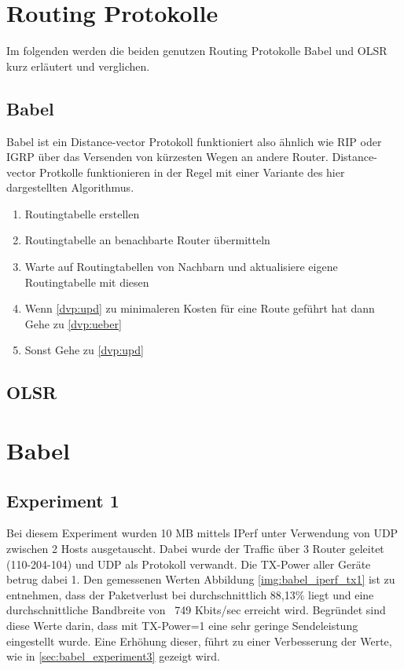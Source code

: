\documentclass[10pt]{scrartcl}
\begin{document}
	
		
		
	
	
\section{Routing Protokolle}
	Im folgenden werden die beiden genutzen Routing Protokolle Babel und OLSR kurz erläutert und verglichen.
	
	\subsection{Babel}
	Babel ist ein Distance-vector Protokoll funktioniert also ähnlich wie RIP oder IGRP über das Versenden von kürzesten Wegen an andere Router. Distance-vector Protkolle funktionieren in der Regel mit einer Variante des hier dargestellten Algorithmus.
	
	\begin{enumerate}
		\item Routingtabelle erstellen
		\item \label{dvp:ueber} Routingtabelle an benachbarte Router übermitteln
		\item \label{dvp:upd} Warte auf Routingtabellen von Nachbarn und aktualisiere eigene Routingtabelle mit diesen
		\item Wenn \ref{dvp:upd} zu minimaleren Kosten für eine Route geführt hat dann
			\subitem Gehe zu \ref{dvp:ueber}
		\item Sonst
			\subitem Gehe zu \ref{dvp:upd}
	\end{enumerate}
	
	
	
	\subsection{OLSR}

\section{Babel}
	\subsection{Experiment 1}\label{sec:babel_experiment1}
	Bei diesem Experiment wurden 10 MB mittels IPerf  unter Verwendung von UDP zwischen 2 Hosts ausgetauscht. Dabei wurde der Traffic über 3 Router geleitet (110-204-104) und UDP als Protokoll verwandt. Die TX-Power aller Geräte betrug dabei 1. 
Den gemessenen Werten Abbildung \ref{img:babel_iperf_tx1} ist zu entnehmen, dass der Paketverlust bei durchschnittlich 88,13\% liegt und eine durchschnittliche Bandbreite von ~749 Kbits/sec erreicht wird.
Begründet sind diese Werte darin, dass mit TX-Power=1 eine sehr geringe Sendeleistung eingestellt wurde. Eine Erhöhung dieser, führt zu einer Verbesserung der Werte, wie in \ref{sec:babel_experiment3} gezeigt wird.
\end{document}
